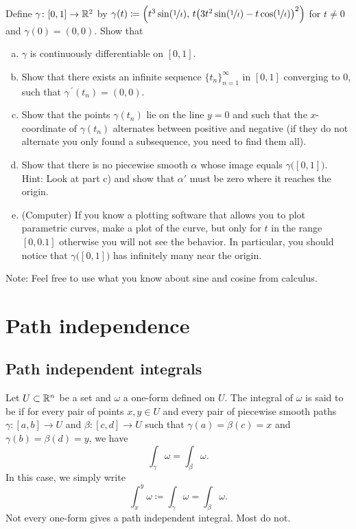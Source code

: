 \begin{exercise}
Define $\gamma \colon [0,1] \to {\mathbb{R}}^2$ by
$\gamma(t) \coloneqq \Bigl( t^3 \sin(\nicefrac{1}{t}),\,
t{\bigl(3t^2\sin(\nicefrac{1}{t})-t\cos(\nicefrac{1}{t})\bigr)}^2 \Bigr)$
for
$t \not= 0$ and $\gamma(0) = (0,0)$.  Show that
\begin{enumerate}[a)]
\item
$\gamma$ is continuously differentiable on $[0,1]$.
\item
Show that there exists an infinite sequence $\{ t_n \}_{n=1}^\infty$ in $[0,1]$
converging to 0, such that
$\gamma^{\:\prime}(t_n) = (0,0)$.
\item
Show that the points $\gamma(t_n)$ lie on the line $y=0$ and such
that the $x$-coordinate of $\gamma(t_n)$ alternates between positive and
negative (if they do not alternate you only found a subsequence,
you need to find them all).
\item
Show that there is no piecewise smooth $\alpha$ whose image equals
$\gamma\bigl([0,1]\bigr)$.  Hint: Look at part c) and show that $\alpha'$
must be zero where it reaches the origin.
\item
(Computer) If you know a plotting software that allows you to plot
parametric curves, make a plot of the curve, but only for $t$ in the
range $[0,0.1]$ otherwise you will not see the behavior.  In particular, you
should notice that $\gamma\bigl([0,1]\bigr)$ has infinitely many
near the origin.
\end{enumerate}
Note: Feel free to use what you know about sine and cosine from calculus.
\end{exercise}


\sectionnewpage
\section{Path independence}
\label{sec:pathind}


\subsection{Path independent integrals}

Let $U \subset {\mathbb{R}}^n$ be a set and $\omega$ a one-form defined on $U$.
The integral of $\omega$
is said to be \emph{}
if for every pair of points $x,y \in U$ and
every pair of piecewise smooth paths
$\gamma \colon [a,b] \to U$ and
$\beta \colon [c,d] \to U$ such that $\gamma(a) = \beta(c) = x$
and $\gamma(b) = \beta(d) = y$, we have
\begin{equation*}
\int_\gamma \omega = \int_\beta \omega .
\end{equation*}
In this case, we simply write
\begin{equation*}
\int_x^y \omega \coloneqq \int_\gamma \omega = \int_\beta \omega .
\end{equation*}
Not every one-form gives a path independent integral.  Most do not.

